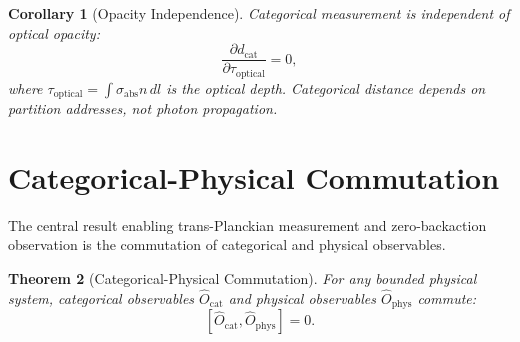 \documentclass[twocolumn,10pt]{article}
\newtheorem{theorem}{Theorem}[section]
\newtheorem{corollary}[theorem]{Corollary}
\theoremstyle{definition}
\newcommand{\dcat}{d_{\mathrm{cat}}}
\newcommand{\Ocat}{\hat{O}_{\mathrm{cat}}}
\newcommand{\Ophys}{\hat{O}_{\mathrm{phys}}}
\begin{document}
\begin{corollary}[Opacity Independence]\label{cor:opacity}
Categorical measurement is independent of optical opacity:
\begin{equation}\label{eq:opacity_indep}
    \frac{\partial \dcat}{\partial \tau_{\mathrm{optical}}} = 0,
\end{equation}
where $\tau_{\mathrm{optical}} = \int \sigma_{\mathrm{abs}} n\, dl$ is the optical depth. Categorical distance depends on partition addresses, not photon propagation.
\end{corollary}

\section{Categorical-Physical Commutation}\label{sec:commutation}

The central result enabling trans-Planckian measurement and zero-backaction observation is the commutation of categorical and physical observables.

\begin{theorem}[Categorical-Physical Commutation]\label{thm:commutation}
For any bounded physical system, categorical observables $\Ocat$ and physical observables $\Ophys$ commute:
\begin{equation}\label{eq:commutation}
    \boxed{[\Ocat, \Ophys] = 0.}
\end{equation}
\end{theorem}
\end{document}
